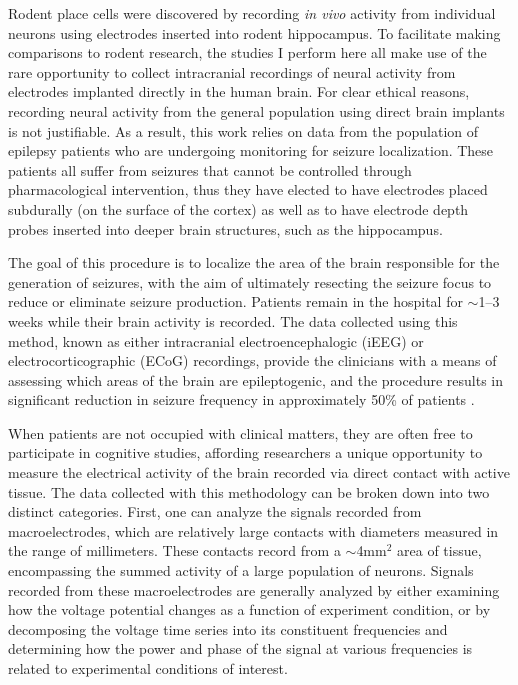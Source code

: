 Rodent place cells were discovered by recording \textit{in vivo} activity from individual neurons using electrodes inserted into rodent hippocampus. To facilitate making comparisons to rodent research, the studies I perform here all make use of the rare opportunity to collect intracranial recordings of neural activity from electrodes implanted directly in the human brain. For clear ethical reasons, recording neural activity from the general population using direct brain implants is not justifiable. As a result, this work relies on data from the population of epilepsy patients who are undergoing monitoring for seizure localization. These patients all suffer from seizures that cannot be controlled through pharmacological intervention, thus they have elected to have electrodes placed subdurally (on the surface of the cortex) as well as to have electrode depth probes inserted into deeper brain structures, such as the hippocampus.

The goal of this procedure is to localize the area of the brain responsible for the generation of seizures, with the aim of ultimately resecting the seizure focus to reduce or eliminate seizure production. Patients remain in the hospital for $\sim$1--3 weeks while their brain activity is recorded. The data collected using this method, known as either intracranial electroencephalogic (iEEG) or electrocorticographic (ECoG) recordings, provide the clinicians with a means of assessing which areas of the brain are epileptogenic, and the procedure results in significant reduction in seizure frequency in approximately 50\% of patients \citep{WiebEtal01}. 

When patients are not occupied with clinical matters, they are often free to participate in cognitive studies, affording researchers a unique opportunity to measure the electrical activity of the brain recorded via direct contact with active tissue. The data collected with this methodology can be broken down into two distinct categories. First, one can analyze the signals recorded from macroelectrodes, which are relatively large contacts with diameters measured in the range of millimeters. These contacts record from a $\sim$4mm$^{2}$ area of tissue, encompassing the summed activity of a large population of neurons. Signals recorded from these macroelectrodes are generally analyzed by either examining how the voltage potential changes as a function of experiment condition, or by decomposing the voltage time series into its constituent frequencies and determining how the power and phase of the signal at various frequencies is related to experimental conditions of interest.

